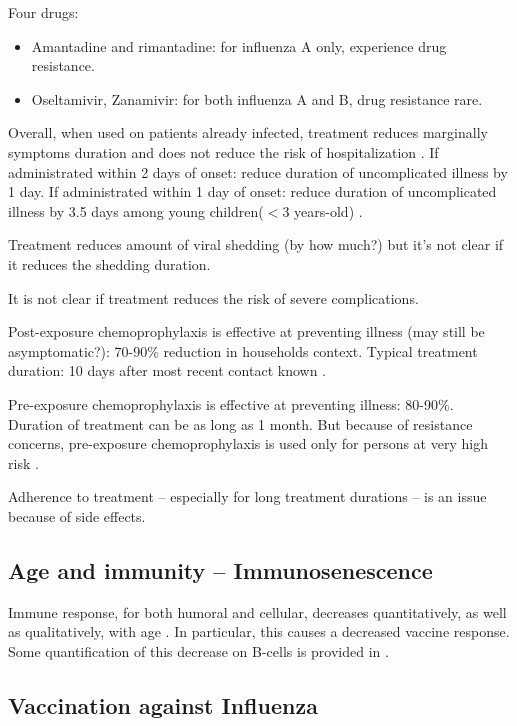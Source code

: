 \documentclass[11pt, onecolumn]{article}
\begin{document}
Four drugs: 
\begin{itemize}
\item Amantadine and rimantadine: for influenza A only, experience drug resistance.
\item Oseltamivir, Zanamivir: for both influenza A and B, drug resistance rare.
\end{itemize}

Overall, when used on patients already infected, treatment reduces marginally symptoms duration and does not reduce the risk of hospitalization \cite{Ebell:2014ic,Jefferson:2014ei}. 
If administrated within 2 days of onset: reduce duration of uncomplicated illness by 1 day.
If administrated within 1 day of onset: reduce duration of uncomplicated illness by 3.5 days among young children($<3$ years-old) \cite{CDC:2011wq}.

Treatment reduces amount of viral shedding (by how much?) but it's not clear if it reduces the shedding duration.

It is not clear if treatment reduces the risk of severe complications.

Post-exposure chemoprophylaxis is effective at preventing illness (may still be asymptomatic?): 70-90\% reduction in households context. Typical treatment duration: 10 days after most recent contact known \cite{CDC:2011wq}.

Pre-exposure chemoprophylaxis is effective at preventing illness: 80-90\%. Duration of treatment can be as long as 1 month. But because of resistance concerns, pre-exposure chemoprophylaxis is used only for persons at very high risk \cite{CDC:2011wq}. 

Adherence to treatment -- especially for long treatment durations -- is an issue because of side effects.



\subsection{Age and immunity -- Immunosenescence}

Immune response, for both humoral and cellular, decreases quantitatively, as well as qualitatively, with age \cite{Vallejo:2011fe}. In particular, this causes a decreased vaccine response. Some quantification of this decrease on B-cells is provided in \cite{Frasca:2011bj,LeMaoult:1997wf}.


\subsection{Vaccination against Influenza }
\end{document}
